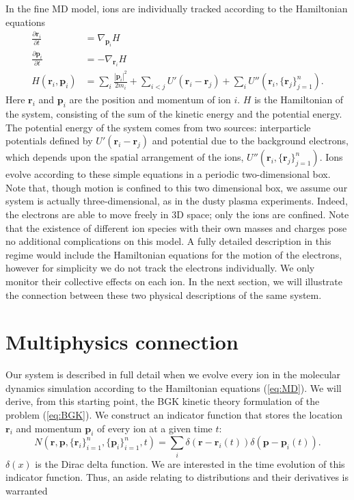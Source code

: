 \documentclass{article}
\begin{document}
In the fine MD model, ions are individually tracked according to the Hamiltonian equations
\begin{equation}
\begin{split}
\frac{\partial \mathbf{r}_i}{\partial t}&=\nabla_{\mathbf{p}_i} H\\
\frac{\partial \mathbf{p}_i}{\partial t}&=-\nabla_{\mathbf{r}_i}H\\
H(\mathbf{r}_i,\mathbf{p}_i)&=\sum_i\frac{|\mathbf{p}_i|^2}{2m_i}+\sum_{i<j}U'(\mathbf{r}_i-\mathbf{r}_j)+\sum_i U''\left(\mathbf{r}_i,\{\mathbf{r}_j\}_{j=1}^n\right).
\end{split}\label{eq:MD}
\end{equation}Here $\mathbf{r}_i$ and $\mathbf{p}_i$ are the position and momentum of ion $i$. $H$ is the Hamiltonian of the system, consisting of the sum of the kinetic energy and the potential energy. The potential energy of the system comes from two sources: interparticle potentials defined by $U'(\mathbf{r}_i-\mathbf{r}_j)$ and potential due to the background electrons, which depends upon the spatial arrangement of the ions, $U''\left(\mathbf{r}_i,\{\mathbf{r}_j\}_{j=1}^n\right)$. Ions evolve according to these simple equations in a periodic two-dimensional box. Note that, though motion is confined to this two dimensional box, we assume our system is actually three-dimensional, as in the dusty plasma experiments. Indeed, the electrons are able to move freely in 3D space; only the ions are confined. Note that the existence of different ion species with their own masses and charges pose no additional complications on this model. A fully detailed description in this regime would include the Hamiltonian equations for the motion of the electrons, however for simplicity we do not track the electrons individually. We only monitor their collective effects on each ion. In the next section, we will illustrate the connection between these two physical descriptions of the same system.

\section{Multiphysics connection}
Our system is described in full detail when we evolve every ion in the molecular dynamics simulation according to the Hamiltonian equations (\ref{eq:MD}). We will derive, from this starting point, the BGK kinetic theory formulation of the problem (\ref{eq:BGK}). We construct an indicator function that stores the location $\mathbf{r}_i$ and momentum $\mathbf{p}_i$ of every ion at a given time $t$:
\begin{equation}N(\mathbf{r},\mathbf{p},\{\mathbf{r}_i\}_{i=1}^n,\{\mathbf{p}_i\}_{i=1}^n,t)=\sum_i\delta\left(\mathbf{r}-\mathbf{r}_i(t)\right)\delta\left(\mathbf{p}-\mathbf{p}_i(t)\right).
\end{equation}$\delta(x)$ is the Dirac delta function. We are interested in the time evolution of this indicator function. Thus, an aside relating to distributions and their derivatives is warranted
\end{document}
